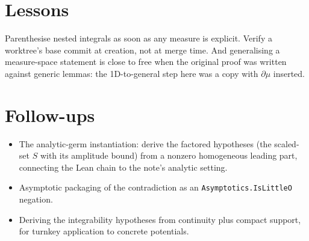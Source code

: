 \documentclass[11pt]{article}
\begin{document}
\section{Lessons}

Parenthesise nested integrals as soon as any measure is explicit. Verify a
worktree's base commit at creation, not at merge time. And
generalising a measure-space statement is close to free when the original
proof was written against generic lemmas: the 1D-to-general step here was a
copy with $\partial\mu$ inserted.

\section{Follow-ups}

\begin{itemize}
\item The analytic-germ instantiation: derive the factored hypotheses (the
scaled-set $S$ with its amplitude bound) from a nonzero homogeneous leading
part, connecting the Lean chain to the note's analytic setting.
\item Asymptotic packaging of the contradiction as an
\texttt{Asymptotics.IsLittleO} negation.
\item Deriving the integrability hypotheses from continuity plus compact
support, for turnkey application to concrete potentials.
\end{itemize}
\end{document}
